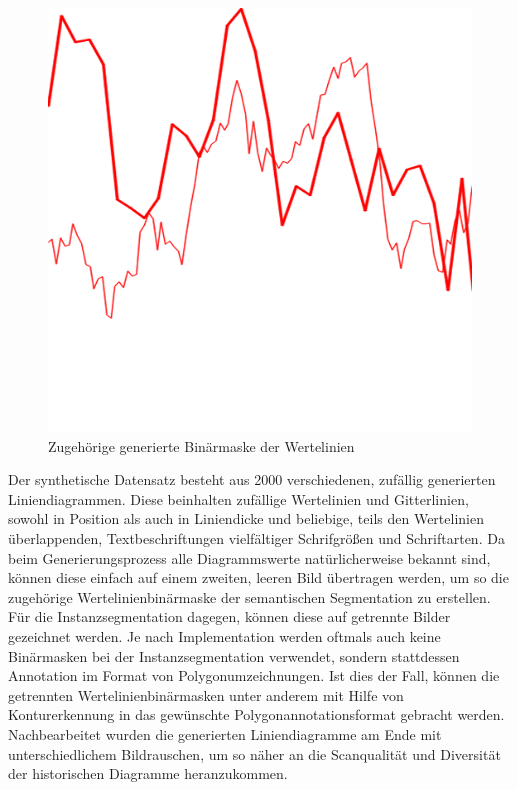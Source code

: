 \begin{figure}[H]
\begin{minipage}{0.475\textwidth}
        \includegraphics[width=\linewidth]{Methodik/img/lines_synthetic_mask.png}
        \caption{ Zugehörige generierte Binärmaske der Wertelinien}
        \label{fig:lines_synthetic_mask}
    \end{minipage}
\end{figure}

Der synthetische Datensatz besteht aus 2000 verschiedenen, zufällig generierten Liniendiagrammen. Diese beinhalten zufällige Wertelinien und Gitterlinien, sowohl in Position als auch in Liniendicke und beliebige, teils den Wertelinien überlappenden, Textbeschriftungen vielfältiger Schrifgrößen und Schriftarten. Da beim Generierungsprozess alle Diagrammswerte natürlicherweise bekannt sind, können diese einfach auf einem zweiten, leeren Bild übertragen werden, um so die zugehörige Wertelinienbinärmaske der semantischen Segmentation zu erstellen. Für die Instanzsegmentation dagegen, können diese auf getrennte Bilder gezeichnet werden. Je nach Implementation werden oftmals auch keine Binärmasken bei der Instanzsegmentation verwendet, sondern stattdessen Annotation im Format von Polygonumzeichnungen. Ist dies der Fall, können die getrennten Wertelinienbinärmasken unter anderem mit Hilfe von Konturerkennung in das gewünschte Polygonannotationsformat gebracht werden. Nachbearbeitet wurden die generierten Liniendiagramme am Ende mit unterschiedlichem Bildrauschen, um so näher an die Scanqualität und Diversität der historischen Diagramme heranzukommen.

